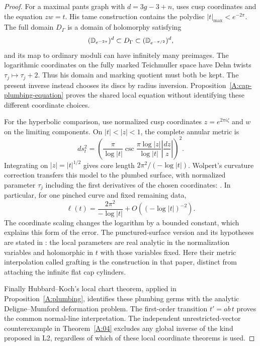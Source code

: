 \begin{proof}
For a maximal pants graph with $d=3g-3+n$, \citet[Theorems~1
and~3, pp.~501--503; \S\S2--3]{Kra1990} uses cusp coordinates and
the equation $zw=t$. His tame construction contains the polydisc
$|t|_{\max}<e^{-2\pi}$. The full domain $D_\Gamma$ is a domain of
holomorphy satisfying
\[
  ({\mathbb{D}}_{e^{-2\pi}})^d\subset D_\Gamma
                    \subset({\mathbb{D}}_{e^{-\pi/2}})^d,
\]
and its map to ordinary moduli can have infinitely many preimages.
The logarithmic coordinates on the fully marked Teichmuller space
have Dehn twists $\tau_j\mapsto\tau_j+2$.
Thus his domain and marking quotient must both be kept.
The present inverse instead chooses its discs by radius inversion.
Proposition~\ref{A:cap-plumbing-equation} proves the shared local
equation without identifying these different coordinate choices.

For the hyperbolic comparison, use normalized cusp coordinates
$z=e^{2\pi i\zeta}$ and $w$ on the limiting components. On
$|t|<|z|<1$, the complete annular metric is
\[
 ds_t^2=\left(
 \frac{\pi}{\log|t|}
 \csc\frac{\pi\log|z|}{\log|t|}
 \left|\frac{dz}{z}\right|\right)^2.
\]
Integrating on $|z|=|t|^{1/2}$ gives core length
$2\pi^2/(-\log|t|)$. Wolpert's curvature correction transfers this
model to the plumbed surface, with normalized parameter
$\tau_j$ including the first derivatives of the chosen coordinates:
\citet[Expansion~4.2, p.~445, and Example~4.3, p.~446]{Wolpert1990}.
In particular, for one pinched curve and fixed remaining data,
\[
 \ell(t)=\frac{2\pi^2}{-\log|t|}
                   +O((-\log|t|)^{-2}).
\]
The coordinate scaling changes the logarithm by a bounded constant,
which explains this form of the error.
The punctured-surface version and its hypotheses are stated in
\citet[\S2, Theorems~4 and~6]{ObitsuWolpert2008}: the local
parameters are real analytic in the normalization variables and
holomorphic in $t$ with those variables fixed. Here their metric
interpolation called grafting is the construction in that paper,
distinct from attaching the infinite flat cap cylinders.

Finally Hubbard--Koch's local chart theorem, applied in
Proposition~\ref{A:plumbing}, identifies these plumbing germs with
the analytic Deligne--Mumford deformation problem. The first-order
transition $t'=ab\,t$ proves the common normal-line interpretation.
The independent unrestricted-vector counterexample in
Theorem~\ref{A:04} excludes any global inverse of the kind proposed
in L2, regardless of which of these local coordinate theorems is
used.
\end{proof}

